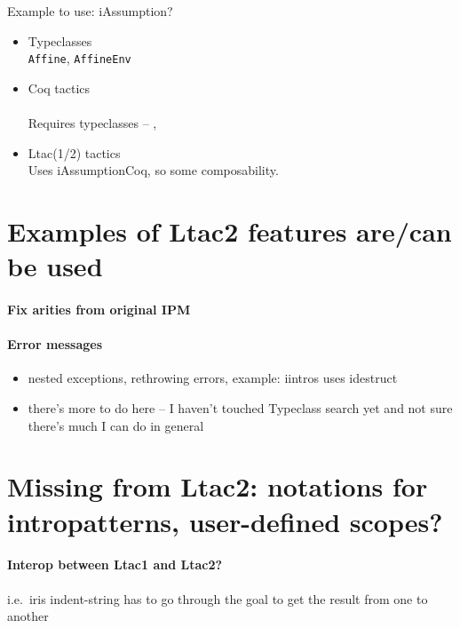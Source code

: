 Example to use: iAssumption?
\begin{itemize}
\item Typeclasses\\
  \verb|Affine|, \verb|AffineEnv|
\item Coq tactics\\
  \\
  Requires typeclasses -- ,\\
\item Ltac(1/2) tactics\\
  Uses iAssumptionCoq, so some composability.
\end{itemize}


\section{Examples of Ltac2 features are/can be used}

\paragraph{Fix arities from original IPM}

\paragraph{Error messages}

\begin{itemize}
\item nested exceptions, rethrowing errors, example: iintros uses idestruct
\item there's more to do here -- I haven't touched Typeclass search yet and not sure there's much I can do in general
\end{itemize}

\section{Missing from Ltac2: notations for intropatterns, user-defined scopes?}

\paragraph{Interop between Ltac1 and Ltac2?}
i.e.\ iris indent-string has to go through the goal to get the result from one to another

